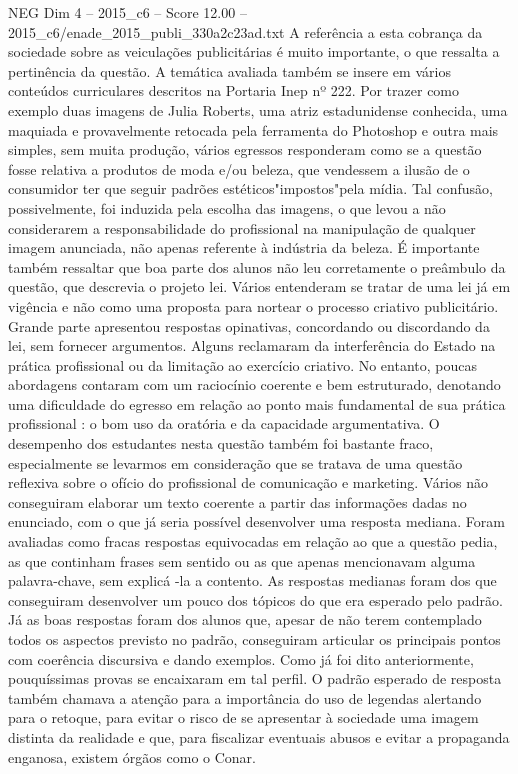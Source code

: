 \begin{textsample}{NEG Dim 4 – 2015\_c6 – Score 12.00 – 2015\_c6/enade\_2015\_publi\_330a2c23ad.txt}
A referência a esta cobrança da sociedade sobre as veiculações publicitárias é muito importante, o que ressalta a pertinência da questão.
A temática avaliada também se insere em vários conteúdos curriculares descritos na Portaria Inep nº 222.
Por trazer como exemplo duas imagens de Julia Roberts, uma atriz estadunidense conhecida, uma maquiada e provavelmente retocada pela ferramenta do Photoshop e outra mais simples, sem muita produção, vários egressos responderam como se a questão fosse relativa a produtos de moda e/ou beleza, que vendessem a ilusão de o consumidor ter que seguir padrões estéticos"impostos"pela mídia.
Tal confusão, possivelmente, foi induzida pela escolha das imagens, o que levou a não considerarem a responsabilidade do profissional na manipulação de qualquer imagem anunciada, não apenas referente à indústria da beleza.
É importante também ressaltar que boa parte dos alunos não leu corretamente o preâmbulo da questão, que descrevia o projeto lei.
Vários entenderam se tratar de uma lei já em vigência e não como uma proposta para nortear o processo criativo publicitário.
Grande parte apresentou respostas opinativas, concordando ou discordando da lei, sem fornecer argumentos.
Alguns reclamaram da interferência do Estado na prática profissional ou da limitação ao exercício criativo.
No entanto, poucas abordagens contaram com um raciocínio coerente e bem estruturado, denotando uma dificuldade do egresso em relação ao ponto mais fundamental de sua prática profissional : o bom uso da oratória e da capacidade argumentativa.
O desempenho dos estudantes nesta questão também foi bastante fraco, especialmente se levarmos em consideração que se tratava de uma questão reflexiva sobre o ofício do profissional de comunicação e marketing.
Vários não conseguiram elaborar um texto coerente a partir das informações dadas no enunciado, com o que já seria possível desenvolver uma resposta mediana.
Foram avaliadas como fracas respostas equivocadas em relação ao que a questão pedia, as que continham frases sem sentido ou as que apenas mencionavam alguma palavra-chave, sem explicá -la a contento.
As respostas medianas foram dos que conseguiram desenvolver um pouco dos tópicos do que era esperado pelo padrão.
Já as boas respostas foram dos alunos que, apesar de não terem contemplado todos os aspectos previsto no padrão, conseguiram articular os principais pontos com coerência discursiva e dando exemplos.
Como já foi dito anteriormente, pouquíssimas provas se encaixaram em tal perfil.
O padrão esperado de resposta também chamava a atenção para a importância do uso de legendas alertando para o retoque, para evitar o risco de se apresentar à sociedade uma imagem distinta da realidade e que, para fiscalizar eventuais abusos e evitar a propaganda enganosa, existem órgãos como o Conar.

\end{textsample}
